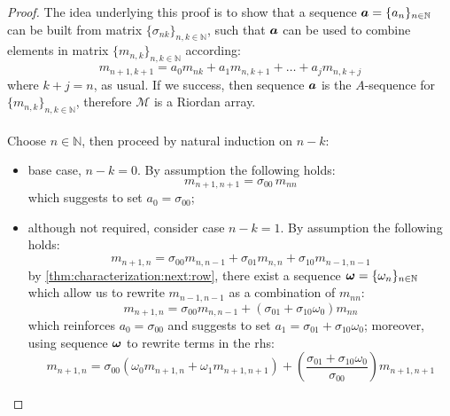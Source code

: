 \begin{proof}
    The idea underlying this proof is to show that a sequence 
    $\boldsymbol{a}=\lbrace a_{n}\rbrace_{n\in\mathbb{N}}$ can be built from
    matrix $\lbrace \sigma_{nk}\rbrace_{n,k\in\mathbb{N}}$,
    such that $\boldsymbol{a}$ can be used to combine elements in matrix
    $\lbrace m_{n,k}\rbrace_{n,k\in\mathbb{N}}$ according: 
    \begin{displaymath}
        m_{n+1,k+1}=a_{0}m_{nk}+a_{1}m_{n,k+1}+\ldots+a_{j}m_{n,k+j}
    \end{displaymath}
    where $k+j=n$, as usual.  If we success, then sequence $\boldsymbol{a}$ is the $A$-sequence for 
    $\lbrace m_{n,k}\rbrace_{n,k\in\mathbb{N}}$, therefore $\mathcal{M}$ is a Riordan array.
    \\\\
    Choose $n\in\mathbb{N}$, then proceed by natural induction on $n-k$:
    \begin{itemize}
        \item base case, $n-k=0$. By assumption the following holds:
            \begin{displaymath}
                m_{n+1,n+1}=\sigma_{00}\,m_{nn}
            \end{displaymath}
            which suggests to set $a_{0}=\sigma_{00}$;
        \item although not required, consider case $n-k=1$. By assumption the following holds:
            \begin{displaymath}
                m_{n+1,n}=\sigma_{00}m_{n,n-1}+\sigma_{01}m_{n,n}+\sigma_{10}m_{n-1,n-1}
            \end{displaymath}
            by \autoref{thm:characterization:next:row}, there exist a sequence $\boldsymbol{\omega}=
            \lbrace \omega_{n}\rbrace_{n\in\mathbb{N}}$ which allow us to rewrite $m_{n-1,n-1}$
            as a combination of $m_{nn}$:
            \begin{displaymath}
                m_{n+1,n}=\sigma_{00}m_{n,n-1}+\left(\sigma_{01}+\sigma_{10}\omega_{0}\right)m_{nn}
            \end{displaymath}
            which reinforces $a_{0}=\sigma_{00}$ and suggests to set 
            $a_{1}=\sigma_{01}+\sigma_{10}\omega_{0}$; moreover, using sequence $\boldsymbol{\omega}$
            to rewrite terms in the \ac{rhs}:
            \begin{displaymath}
                m_{n+1,n}=\sigma_{00}\left(\omega_{0}m_{n+1,n}+\omega_{1}m_{n+1,n+1}\right)+
                    \left(\frac{\sigma_{01}+\sigma_{10}\omega_{0}}{\sigma_{00}}\right)m_{n+1,n+1}

\end{displaymath}
\end{itemize}
\end{proof}

